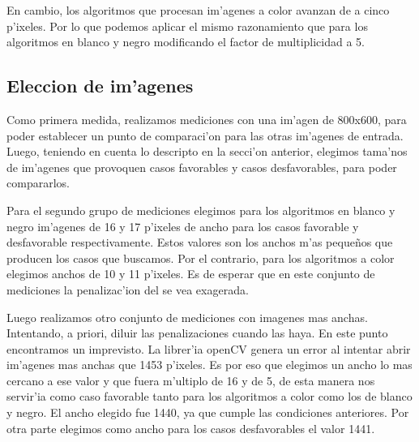 En cambio, los algoritmos que procesan im'agenes a color avanzan de a cinco p'ixeles. Por lo que podemos aplicar el mismo razonamiento que para los algoritmos en blanco y negro modificando el factor de multiplicidad a 5.

\subsection{Eleccion de im'agenes}
Como primera medida, realizamos mediciones con una im'agen de 800x600, para poder establecer un punto de comparaci'on para las otras im'agenes de entrada. Luego, teniendo en cuenta lo descripto en la secci'on anterior, elegimos tama'nos de im'agenes que provoquen casos favorables y casos desfavorables, para poder compararlos. 

Para el segundo grupo de mediciones elegimos para los algoritmos en blanco y negro im'agenes de 16 y 17 p'ixeles de ancho para los casos favorable y desfavorable respectivamente. Estos valores son los anchos m'as pequeños que producen los casos que buscamos. Por el contrario, para los algoritmos a color elegimos anchos de 10 y 11 p'ixeles. Es de esperar que en este conjunto de mediciones la penalizac'ion del \ass se vea exagerada.

Luego realizamos otro conjunto de mediciones con imagenes mas anchas. Intentando, a priori, diluir las penalizaciones cuando las haya. En este punto encontramos un imprevisto. La librer'ia openCV genera un error al intentar abrir im'agenes mas anchas que 1453 p'ixeles. Es por eso que elegimos un ancho lo mas cercano a ese valor y que fuera m'ultiplo de 16 y de 5, de esta manera nos servir'ia como caso favorable tanto para los algoritmos a color como los de blanco y negro. El ancho elegido fue 1440, ya que cumple las condiciones anteriores. Por otra parte elegimos como ancho para los casos desfavorables el valor 1441.



